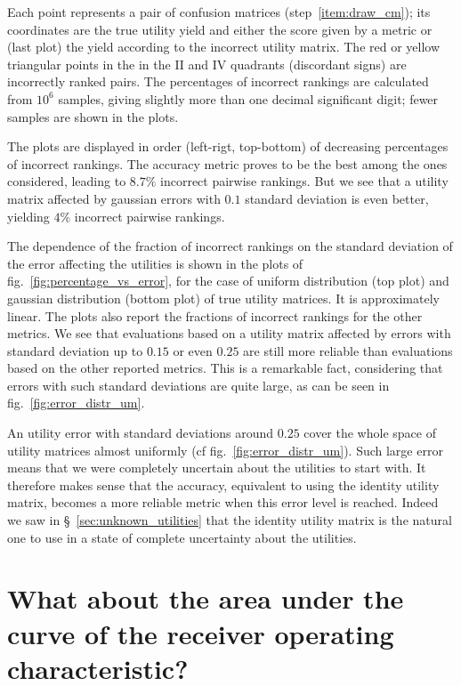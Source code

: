 \documentclass[\ifafour a4paper,12pt,\else a5paper,10pt,\fi%
onecolumn,oneside,article,%
british%
]{memoir}
\theoremstyle{remark}
\theoremstyle{innote}
\renewcommand*{\|}[1][]{\nonscript\:#1\vert\nonscript\:\mathopen{}}
\newcommand*{\sect}{\S}%
\newcommand*{\fig}{fig.}%
\begin{document}
Each point represents a pair of confusion matrices (step~\ref{item:draw_cm}); its coordinates are the true utility yield and either the score given by a metric or (last plot) the yield according to the incorrect utility matrix. The red or yellow triangular points in the in the II and IV quadrants (discordant signs) are incorrectly ranked pairs. The percentages of incorrect rankings are calculated from $10^{6}$ samples, giving slightly more than one decimal significant digit; fewer samples are shown in the plots.

The plots are displayed in order (left-rigt, top-bottom) of decreasing percentages of incorrect rankings. The accuracy metric proves to be the best among the ones considered, leading to $8.7\%$ incorrect pairwise rankings. But we see that a utility matrix affected by gaussian errors with $0.1$ standard deviation is even better, yielding $4\%$ incorrect pairwise rankings.

The dependence of the fraction of incorrect rankings on the standard deviation of the error affecting the utilities is shown in the plots of \fig~\ref{fig:percentage_vs_error}, for the case of uniform distribution (top plot) and gaussian distribution (bottom plot) of true utility matrices. It is approximately linear. The plots also report the fractions of incorrect rankings for the other metrics. We see that evaluations based on a utility matrix affected by errors with standard deviation up to $0.15$ or even $0.25$ are still more reliable than evaluations based on the other reported metrics. This is a remarkable fact, considering that errors with such standard deviations are quite large, as can be seen in \fig~\ref{fig:error_distr_um}.

An utility error with standard deviations around $0.25$ cover the whole space of utility matrices almost uniformly (cf \fig~\ref{fig:error_distr_um}). Such large error means that we were completely uncertain about the utilities to start with. It therefore makes sense that the accuracy, equivalent to using the identity utility matrix, becomes a more reliable metric when this error level is reached. Indeed we saw in \sect~\ref{sec:unknown_utilities} that the identity utility matrix is the natural one to use in a state of complete uncertainty about the utilities.


\section{What about the area under the curve of the receiver operating characteristic?}
\label{sec:auc}
\end{document}
